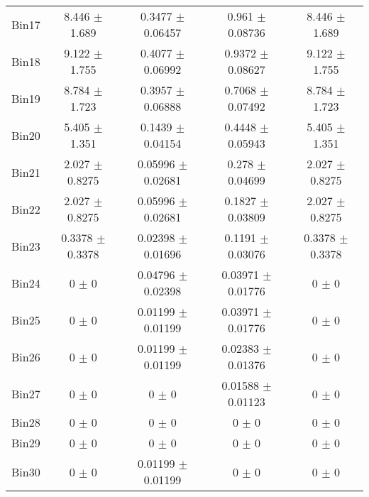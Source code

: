 \begin{tabular}{@{\extracolsep{4pt}}lcccc@{}}
     Bin17 & 8.446 $\pm$ 1.689 & 0.3477 $\pm$ 0.06457 & 0.961 $\pm$ 0.08736 & 8.446 $\pm$ 1.689 \\ 
     Bin18 & 9.122 $\pm$ 1.755 & 0.4077 $\pm$ 0.06992 & 0.9372 $\pm$ 0.08627 & 9.122 $\pm$ 1.755 \\ 
     Bin19 & 8.784 $\pm$ 1.723 & 0.3957 $\pm$ 0.06888 & 0.7068 $\pm$ 0.07492 & 8.784 $\pm$ 1.723 \\ 
     Bin20 & 5.405 $\pm$ 1.351 & 0.1439 $\pm$ 0.04154 & 0.4448 $\pm$ 0.05943 & 5.405 $\pm$ 1.351 \\ 
     Bin21 & 2.027 $\pm$ 0.8275 & 0.05996 $\pm$ 0.02681 & 0.278 $\pm$ 0.04699 & 2.027 $\pm$ 0.8275 \\ 
     Bin22 & 2.027 $\pm$ 0.8275 & 0.05996 $\pm$ 0.02681 & 0.1827 $\pm$ 0.03809 & 2.027 $\pm$ 0.8275 \\ 
     Bin23 & 0.3378 $\pm$ 0.3378 & 0.02398 $\pm$ 0.01696 & 0.1191 $\pm$ 0.03076 & 0.3378 $\pm$ 0.3378 \\ 
     Bin24 & 0 $\pm$ 0 & 0.04796 $\pm$ 0.02398 & 0.03971 $\pm$ 0.01776 & 0 $\pm$ 0 \\ 
     Bin25 & 0 $\pm$ 0 & 0.01199 $\pm$ 0.01199 & 0.03971 $\pm$ 0.01776 & 0 $\pm$ 0 \\ 
     Bin26 & 0 $\pm$ 0 & 0.01199 $\pm$ 0.01199 & 0.02383 $\pm$ 0.01376 & 0 $\pm$ 0 \\ 
     Bin27 & 0 $\pm$ 0 & 0 $\pm$ 0 & 0.01588 $\pm$ 0.01123 & 0 $\pm$ 0 \\ 
     Bin28 & 0 $\pm$ 0 & 0 $\pm$ 0 & 0 $\pm$ 0 & 0 $\pm$ 0 \\ 
     Bin29 & 0 $\pm$ 0 & 0 $\pm$ 0 & 0 $\pm$ 0 & 0 $\pm$ 0 \\ 
     Bin30 & 0 $\pm$ 0 & 0.01199 $\pm$ 0.01199 & 0 $\pm$ 0 & 0 $\pm$ 0 \\ 
\hline\hline
  \end{tabular}
